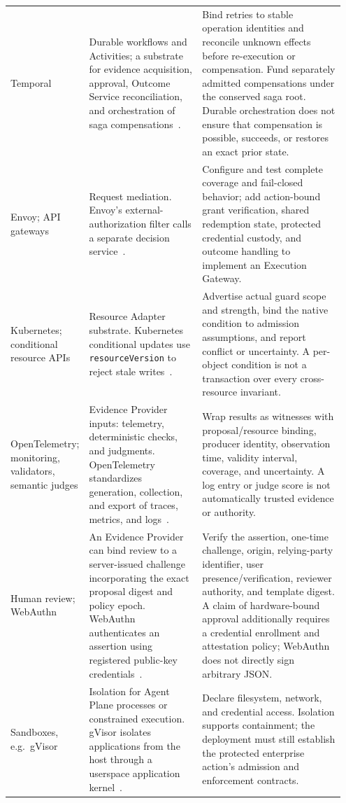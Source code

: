 {\begin{longtable}{@{}L{0.18\linewidth}L{0.34\linewidth}L{0.43\linewidth}@{}}
\addlinespace
Temporal & Durable workflows and Activities; a substrate for evidence acquisition, approval, Outcome Service reconciliation, and orchestration of saga compensations~\cite{temporal2026,temporalactivities2026,temporalsaga2023}. & Bind retries to stable operation identities and reconcile unknown effects before re-execution or compensation. Fund separately admitted compensations under the conserved saga root. Durable orchestration does not ensure that compensation is possible, succeeds, or restores an exact prior state.\\
\addlinespace
Envoy; API gateways & Request mediation. Envoy's external-authorization filter calls a separate decision service~\cite{envoyextauth2026}. & Configure and test complete coverage and fail-closed behavior; add action-bound grant verification, shared redemption state, protected credential custody, and outcome handling to implement an Execution Gateway.\\
\addlinespace
Kubernetes; conditional resource APIs & Resource Adapter substrate. Kubernetes conditional updates use \texttt{resourceVersion} to reject stale writes~\cite{kubernetesapi2026}. & Advertise actual guard scope and strength, bind the native condition to admission assumptions, and report conflict or uncertainty. A per-object condition is not a transaction over every cross-resource invariant.\\
\addlinespace
OpenTelemetry; monitoring, validators, semantic judges & Evidence Provider inputs: telemetry, deterministic checks, and judgments. OpenTelemetry standardizes generation, collection, and export of traces, metrics, and logs~\cite{opentelemetry2026}. & Wrap results as witnesses with proposal/resource binding, producer identity, observation time, validity interval, coverage, and uncertainty. A log entry or judge score is not automatically trusted evidence or authority.\\
\addlinespace
Human review; WebAuthn & An Evidence Provider can bind review to a server-issued challenge incorporating the exact proposal digest and policy epoch. WebAuthn authenticates an assertion using registered public-key credentials~\cite{webauthn3}. & Verify the assertion, one-time challenge, origin, relying-party identifier, user presence/verification, reviewer authority, and template digest. A claim of hardware-bound approval additionally requires a credential enrollment and attestation policy; WebAuthn does not directly sign arbitrary JSON.\\
\addlinespace
Sandboxes, e.g.\ gVisor & Isolation for Agent Plane processes or constrained execution. gVisor isolates applications from the host through a userspace application kernel~\cite{gvisor2026}. & Declare filesystem, network, and credential access. Isolation supports containment; the deployment must still establish the protected enterprise action's admission and enforcement contracts.\\
\end{longtable}
}

